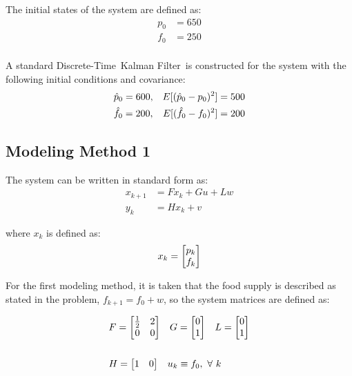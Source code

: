 \documentclass[]{article}
\newcommand{\KF}{Kalman Filter}
\newcommand{\DT}{Discrete-Time}
\newcommand{\DTKF}{\DT \ \KF}
\begin{document}
	The initial states of the system are defined as:
	\begin{equation}
		\begin{aligned}
			p_0 &= 650\\
			f_0 &= 250\\
		\end{aligned}
	\end{equation}
	
	A standard \DTKF \ is constructed for the system with the following initial conditions and covariance:
	\begin{equation}
		\begin{aligned}
			&\hat{p}_0 = 600, &\boldmath{E}[(\hat{p}_0 - p_0)^2] = 500\\
			&\hat{f}_0 = 200, &\boldmath{E}[(\hat{f}_0 - f_0)^2] = 200\\
		\end{aligned}
	\end{equation}
	
	\newpage
	\subsection{Modeling Method 1}\label{sec:pblm1_method1}
		The system can be written in standard form as:
		\begin{equation}
			\begin{aligned}
				x_{k+1} &= F x_k + G u + L w\\
				y_k		&= H x_k + v
			\end{aligned} \label{eq:Standard_SS_Model}
		\end{equation}
	
		where $x_k$ is defined as:
		\begin{equation}
			x_k = \mqty[p_k\\ f_k]
		\end{equation}
		
		For the first modeling method, it is taken that the food supply is described as stated in the problem, $f_{k+1} = f_0 + w$, so the system matrices are defined as:
		
		\begin{equation}
			\begin{aligned}
				&F = \mqty[\frac{1}{2} & 2\\ 0 & 0] \ \ \ G = \mqty[0\\ 1] \ \ \ L = \mqty[0\\ 1]\\
				\\
				&H = \mqty[1 &0] \ \ \ u_k \equiv f_0, \ \forall \ k
			\end{aligned}
		\end{equation}
		
\end{document}
